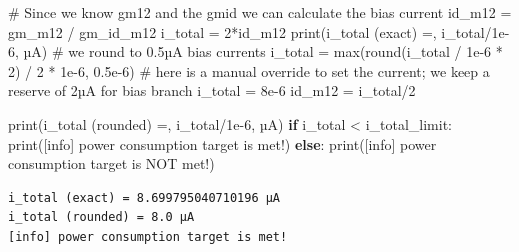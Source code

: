\documentclass[
  a4paper,
  DIV=11,
  numbers=noendperiod]{scrartcl}
\newenvironment{Shaded}{\begin{snugshade}}{\end{snugshade}}
\newcommand{\BuiltInTok}[1]{\textcolor[rgb]{0.00,0.23,0.31}{#1}}
\newcommand{\CommentTok}[1]{\textcolor[rgb]{0.37,0.37,0.37}{#1}}
\newcommand{\ControlFlowTok}[1]{\textcolor[rgb]{0.00,0.23,0.31}{\textbf{#1}}}
\newcommand{\DecValTok}[1]{\textcolor[rgb]{0.68,0.00,0.00}{#1}}
\newcommand{\FloatTok}[1]{\textcolor[rgb]{0.68,0.00,0.00}{#1}}
\newcommand{\NormalTok}[1]{\textcolor[rgb]{0.00,0.23,0.31}{#1}}
\newcommand{\OperatorTok}[1]{\textcolor[rgb]{0.37,0.37,0.37}{#1}}
\newcommand{\StringTok}[1]{\textcolor[rgb]{0.13,0.47,0.30}{#1}}
\begin{document}
\begin{tcolorbox}
\begin{Shaded}
\begin{Highlighting}[]
\CommentTok{\# Since we know gm12 and the gmid we can calculate the bias current}
\NormalTok{id\_m12 }\OperatorTok{=}\NormalTok{ gm\_m12 }\OperatorTok{/}\NormalTok{ gm\_id\_m12}
\NormalTok{i\_total }\OperatorTok{=} \DecValTok{2}\OperatorTok{*}\NormalTok{id\_m12}
\BuiltInTok{print}\NormalTok{(}\StringTok{\textquotesingle{}i\_total (exact) =\textquotesingle{}}\NormalTok{, i\_total}\OperatorTok{/}\FloatTok{1e{-}6}\NormalTok{, }\StringTok{\textquotesingle{}µA\textquotesingle{}}\NormalTok{)}
\CommentTok{\# we round to 0.5µA bias currents}
\NormalTok{i\_total }\OperatorTok{=} \BuiltInTok{max}\NormalTok{(}\BuiltInTok{round}\NormalTok{(i\_total }\OperatorTok{/} \FloatTok{1e{-}6} \OperatorTok{*} \DecValTok{2}\NormalTok{) }\OperatorTok{/} \DecValTok{2} \OperatorTok{*} \FloatTok{1e{-}6}\NormalTok{, }\FloatTok{0.5e{-}6}\NormalTok{)}
\CommentTok{\# here is a manual override to set the current; we keep a reserve of 2µA for bias branch}
\NormalTok{i\_total }\OperatorTok{=} \FloatTok{8e{-}6}
\NormalTok{id\_m12 }\OperatorTok{=}\NormalTok{ i\_total}\OperatorTok{/}\DecValTok{2}

\BuiltInTok{print}\NormalTok{(}\StringTok{\textquotesingle{}i\_total (rounded) =\textquotesingle{}}\NormalTok{, i\_total}\OperatorTok{/}\FloatTok{1e{-}6}\NormalTok{, }\StringTok{\textquotesingle{}µA\textquotesingle{}}\NormalTok{)}
\ControlFlowTok{if}\NormalTok{ i\_total }\OperatorTok{\textless{}}\NormalTok{ i\_total\_limit:}
    \BuiltInTok{print}\NormalTok{(}\StringTok{\textquotesingle{}[info] power consumption target is met!\textquotesingle{}}\NormalTok{)}
\ControlFlowTok{else}\NormalTok{:}
    \BuiltInTok{print}\NormalTok{(}\StringTok{\textquotesingle{}[info] power consumption target is NOT met!\textquotesingle{}}\NormalTok{) }
\end{Highlighting}
\end{Shaded}

\begin{verbatim}
i_total (exact) = 8.699795040710196 µA
i_total (rounded) = 8.0 µA
[info] power consumption target is met!
\end{verbatim}


\end{tcolorbox}
\end{document}
